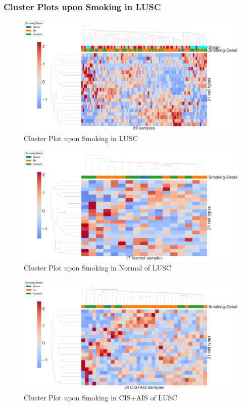 \documentclass{beamer}
\begin{document}
    \begin{frame}[allowframebreaks]
        \frametitle{Cluster Plots upon Smoking in LUSC}

        \begin{figure}
            \includegraphics[width=0.9 \linewidth]{figures/BisqueRNA/clustermap/STAR.FPKM.GSE162498.SQC.Smoking/All.pdf}
            \caption{Cluster Plot upon Smoking in LUSC}
        \end{figure}

        \begin{figure}
            \includegraphics[width=0.9 \linewidth]{figures/BisqueRNA/clustermap/STAR.FPKM.GSE162498.SQC.Smoking/Normal.pdf}
            \caption{Cluster Plot upon Smoking in Normal of LUSC}
        \end{figure}

        \begin{figure}
            \includegraphics[width=0.9 \linewidth]{figures/BisqueRNA/clustermap/STAR.FPKM.GSE162498.SQC.Smoking/CIS+AIS.pdf}
            \caption{Cluster Plot upon Smoking in CIS+AIS of LUSC}
        \end{figure}


\end{frame}
\end{document}
